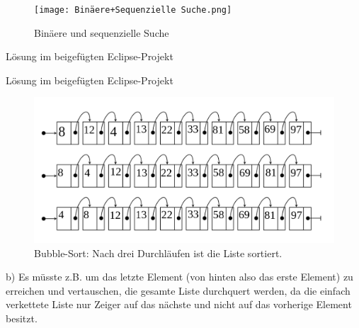 \documentclass[12pt]{scrartcl}
\begin{document}

\exercise{}
\begin{figure}[h]
\texttt{[image: Binäere+Sequenzielle Suche.png]}
\caption{Binäere und sequenzielle Suche}
\end{figure}


\exercise{}
Lösung im beigefügten Eclipse-Projekt

\exercise{}
Lösung im beigefügten Eclipse-Projekt

\exercise{}
\begin{figure}[h]
\includegraphics[scale=0.5]{BubbleSort.png}
\caption{Bubble-Sort: Nach drei Durchläufen ist die Liste sortiert.}
\end{figure}

b) Es müsste z.B. um das letzte Element (von hinten also das erste Element) zu erreichen und vertauschen, die gesamte Liste durchquert werden, da die einfach verkettete Liste nur Zeiger auf das nächste und nicht auf das vorherige Element besitzt.

\end{document}
